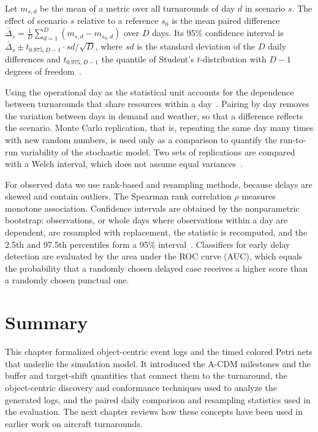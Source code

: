 \begin{definition}
Let $m_{s,d}$ be the mean of a metric over all turnarounds of day $d$ in scenario $s$. The effect of scenario $s$ relative to a reference $s_0$ is the mean paired difference $\bar\Delta_s=\frac{1}{D}\sum_{d=1}^{D}(m_{s,d}-m_{s_0,d})$ over $D$ days. Its 95\% confidence interval is $\bar\Delta_s\pm t_{0.975,D-1}\cdot \mathit{sd}/\sqrt{D}$, where $\mathit{sd}$ is the standard deviation of the $D$ daily differences and $t_{0.975,D-1}$ the quantile of Student's $t$-distribution with $D-1$ degrees of freedom~\cite{law2015simulation}.
\end{definition}

Using the operational day as the statistical unit accounts for the dependence between turnarounds that share resources within a day~\cite{law2015simulation}. Pairing by day removes the variation between days in demand and weather, so that a difference reflects the scenario. Monte Carlo replication, that is, repeating the same day many times with new random numbers, is used only as a comparison to quantify the run-to-run variability of the stochastic model. Two sets of replications are compared with a Welch interval, which does not assume equal variances~\cite{welch1947}.

For observed data we use rank-based and resampling methods, because delays are skewed and contain outliers. The Spearman rank correlation $\rho$ measures monotone association. Confidence intervals are obtained by the nonparametric bootstrap: observations, or whole days where observations within a day are dependent, are resampled with replacement, the statistic is recomputed, and the 2.5th and 97.5th percentiles form a 95\% interval~\cite{efron1993bootstrap}. Classifiers for early delay detection are evaluated by the area under the ROC curve (AUC), which equals the probability that a randomly chosen delayed case receives a higher score than a randomly chosen punctual one.

\section{Summary}

This chapter formalized object-centric event logs and the timed colored Petri nets that underlie the simulation model. It introduced the A-CDM milestones and the buffer and target-shift quantities that connect them to the turnaround, the object-centric discovery and conformance techniques used to analyze the generated logs, and the paired daily comparison and resampling statistics used in the evaluation. The next chapter reviews how these concepts have been used in earlier work on aircraft turnarounds.
